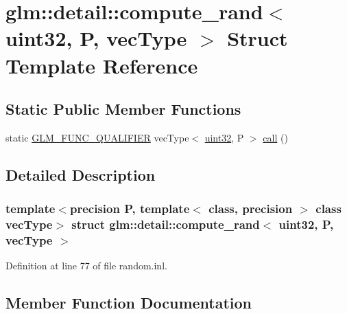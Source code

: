 \hypertarget{structglm_1_1detail_1_1compute__rand_3_01uint32_00_01_p_00_01vec_type_01_4}{}\section{glm\+::detail\+::compute\+\_\+rand$<$ uint32, P, vec\+Type $>$ Struct Template Reference}
\label{structglm_1_1detail_1_1compute__rand_3_01uint32_00_01_p_00_01vec_type_01_4}
\subsection*{Static Public Member Functions}
\begin{DoxyCompactItemize}
\item 
static \mbox{\hyperlink{setup_8hpp_a33fdea6f91c5f834105f7415e2a64407}{G\+L\+M\+\_\+\+F\+U\+N\+C\+\_\+\+Q\+U\+A\+L\+I\+F\+I\+ER}} vec\+Type$<$ \mbox{\hyperlink{namespaceglm_1_1detail_ade6cfbf377022aaa391af8cd50489222}{uint32}}, P $>$ \mbox{\hyperlink{structglm_1_1detail_1_1compute__rand_3_01uint32_00_01_p_00_01vec_type_01_4_a17aa209c7dbc4ffabd9373b4b8b99f8a}{call}} ()
\end{DoxyCompactItemize}


\subsection{Detailed Description}
\subsubsection*{template$<$precision P, template$<$ class, precision $>$ class vec\+Type$>$\newline
struct glm\+::detail\+::compute\+\_\+rand$<$ uint32, P, vec\+Type $>$}



Definition at line 77 of file random.\+inl.



\subsection{Member Function Documentation}
\mbox{\label{structglm_1_1detail_1_1compute__rand_3_01uint32_00_01_p_00_01vec_type_01_4_a17aa209c7dbc4ffabd9373b4b8b99f8a}} 
